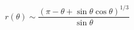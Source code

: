 \begin{equation}
r\left( \theta \right) \sim \frac{\left( \pi -\theta +\sin \theta \cos
\theta \right) ^{1/3}}{\sin \theta }  \label{shape}
\end{equation}

